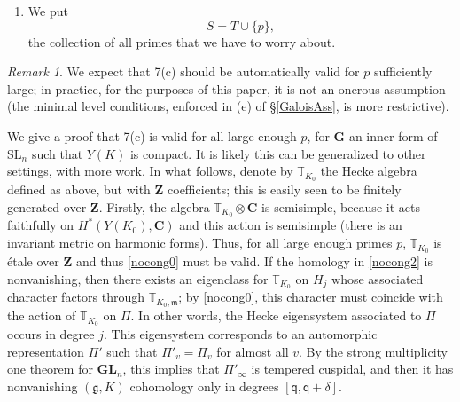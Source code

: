 \documentclass[10pt]{amsart}
\newcommand{\Z}{\mathbf{Z}}
\newcommand{\C}{\mathbf{C}}
\newcommand{\ramprimes}{S}
\theoremstyle{remark}
\newtheorem*{remark}{Remark}
\newcommand{\BWq}{\mathsf{q}}
\begin{document}
\begin{enumerate}
\begin{itemize}
%
%
%
%
%
%



 
 
\end{itemize}
 
\item We put $$\ramprimes  = T \cup \{p\},$$ the collection of all primes that we have to worry about.  



%
%
%
%
%
%



 


 

  
\end{enumerate}

 
 \begin{remark}
We expect that  7(c) should be automatically valid for $p$ sufficiently large; in practice, for the purposes of this paper,
it is not an onerous assumption (the minimal level conditions, enforced in (e) of \S \ref{GaloisAss}, is more restrictive).

We give a proof that 7(c) is valid for all large enough $p$,  for $\mathbf{G}$ an  inner form of $\mathrm{SL}_n$ such that $Y(K)$ is compact.
It is likely this can be generalized to other settings, with more work.    In what follows, denote by $\mathbb{T}_{K_0}$
 the Hecke algebra defined as above, but with $\Z$ coefficients; this is easily seen to be finitely generated over $\Z$.   Firstly,  the algebra $\mathbb{T}_{K_0} \otimes \C$ is semisimple,
 because it acts faithfully on $H^*(Y(K_0), \C)$ and this action is semisimple (there is an invariant metric on harmonic forms). 
 Thus, for all large enough primes $p$, $\mathbb{T}_{K_0}$ is {\'e}tale over $\mathbf{Z}$ and thus \eqref{nocong0} must be valid. 
If  the homology in \eqref{nocong2} is nonvanishing, then 
there exists an eigenclass for $\mathbb{T}_{K_0}$  on $H_j$ whose associated character
factors through $\mathbb{T}_{K_0, \mathfrak{m}}$;  by \eqref{nocong0}, this character must coincide with the action of $\mathbb{T}_{K_0}$
 on $\Pi$.  In other words,  the Hecke eigensystem associated to $\Pi$ occurs in degree $j$.  
 This eigensystem corresponds to an automorphic representation $\Pi'$ such that $\Pi'_v = \Pi_v$
 for almost all $v$.  By the strong multiplicity one theorem for $\mathbf{GL}_n$, this implies that $\Pi'_{\infty}$ is tempered cuspidal, and then
 it has nonvanishing $(\mathfrak{g}, K)$ cohomology only in degrees $[\BWq, \BWq+\delta]$. 
  \end{remark}
\end{document}
